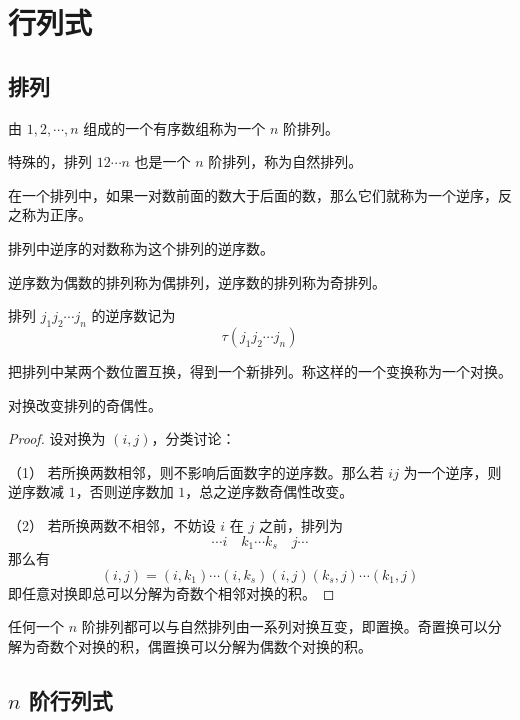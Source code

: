 
\chapter{行列式}

\section{排列}

\begin{definition}
	由 $1,2,\cdots,n$ 组成的一个有序数组称为一个 $n$ 阶排列。
\end{definition}

特殊的，排列 $12\cdots n$ 也是一个 $n$ 阶排列，称为自然排列。

\begin{definition}
	在一个排列中，如果一对数前面的数大于后面的数，那么它们就称为一个逆序，反之称为正序。

	排列中逆序的对数称为这个排列的逆序数。
\end{definition}

逆序数为偶数的排列称为偶排列，逆序数的排列称为奇排列。

排列 $j_1j_2\cdots j_n$ 的逆序数记为
\[\tau(j_1j_2\cdots j_n)\]

\begin{definition}
	把排列中某两个数位置互换，得到一个新排列。称这样的一个变换称为一个对换。
\end{definition}

\begin{theorem}
	对换改变排列的奇偶性。
\end{theorem}

\begin{proof}
	设对换为 $(i,j)$，分类讨论：

	（1） 若所换两数相邻，则不影响后面数字的逆序数。那么若 $ij$ 为一个逆序，则逆序数减 $1$，否则逆序数加 $1$，总之逆序数奇偶性改变。

	（2） 若所换两数不相邻，不妨设 $i$ 在 $j$ 之前，排列为
	\[\cdots i \quad k_1 \cdots k_s \quad j\cdots\]
	那么有
	\[(i,j)=(i,k_1)\cdots(i,k_s)(i,j)(k_s,j)\cdots(k_1,j)\]
	即任意对换即总可以分解为奇数个相邻对换的积。
\end{proof}

任何一个 $n$ 阶排列都可以与自然排列由一系列对换互变，即置换。奇置换可以分解为奇数个对换的积，偶置换可以分解为偶数个对换的积。

\section{\texorpdfstring{$n$ 阶行列式}{n 阶行列式}}

